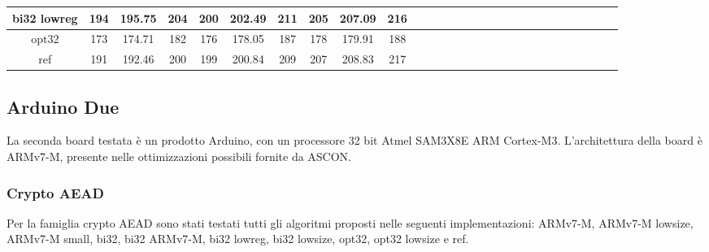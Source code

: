 \documentclass[12pt,a4paper,italian]{report}
\begin{document}
\begin{landscape}
\begin{table}[]
\begin{adjustbox}{width=600pt}
\begin{tabular}{|c|c|c|c|c|c|c|c|c|c|c|c|c|c|c|c|c|c|c|c|c|c|c|c|c|c|c|c|}
				\hline
				bi32 lowreg & 194 & 195.75 & 204 & 200 & 202.49 & 211 & 205 & 207.09 & 216 & & & & & & & & & & & & & & & & & & \\
				\hline
				opt32 & 173 & 174.71 & 182 & 176 & 178.05 & 187 & 178 & 179.91 & 188 & & & & & & & & & & & & & & & & & & \\
				\hline
				ref & 191 & 192.46 & 200 & 199 & 200.84 & 209 & 207 & 208.83 & 217 & & & & & & & & & & & & & & & & & & \\
				\hline
			\end{tabular}
		\end{adjustbox}
	\end{table}
\end{landscape}

\subsection{Arduino Due}

La seconda board testata è un prodotto Arduino, con un processore 32 bit Atmel SAM3X8E ARM Cortex-M3.\cite{arduino} L'architettura della board è ARMv7-M, presente nelle ottimizzazioni possibili fornite da ASCON.\cite{arm}

\subsubsection{Crypto AEAD}

Per la famiglia crypto AEAD sono stati testati tutti gli algoritmi proposti nelle seguenti implementazioni: ARMv7-M, ARMv7-M lowsize, ARMv7-M small, bi32, bi32 ARMv7-M, bi32 lowreg, bi32 lowsize, opt32, opt32 lowsize e ref.
\end{document}
